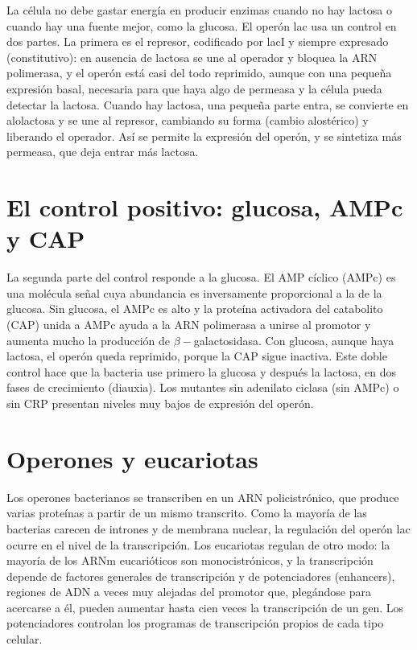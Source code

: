 \documentclass{book}
\begin{document}
La célula no debe gastar energía en producir enzimas cuando no hay lactosa o cuando hay una fuente mejor, como la glucosa. El operón lac usa un control en dos partes. La primera es el represor, codificado por lacI y siempre expresado (constitutivo): en ausencia de lactosa se une al operador y bloquea la ARN polimerasa, y el operón está casi del todo reprimido, aunque con una pequeña expresión basal, necesaria para que haya algo de permeasa y la célula pueda detectar la lactosa. Cuando hay lactosa, una pequeña parte entra, se convierte en alolactosa y se une al represor, cambiando su forma (cambio alostérico) y liberando el operador. Así se permite la expresión del operón, y se sintetiza más permeasa, que deja entrar más lactosa.


\section{El control positivo: glucosa, AMPc y CAP}

La segunda parte del control responde a la glucosa. El AMP cíclico (AMPc) es una molécula señal cuya abundancia es inversamente proporcional a la de la glucosa. Sin glucosa, el AMPc es alto y la proteína activadora del catabolito (CAP) unida a AMPc ayuda a la ARN polimerasa a unirse al promotor y aumenta mucho la producción de \(\beta-\)galactosidasa. Con glucosa, aunque haya lactosa, el operón queda reprimido, porque la CAP sigue inactiva. Este doble control hace que la bacteria use primero la glucosa y después la lactosa, en dos fases de crecimiento (diauxia). Los mutantes sin adenilato ciclasa (sin AMPc) o sin CRP presentan niveles muy bajos de expresión del operón.


\section{Operones y eucariotas}

Los operones bacterianos se transcriben en un ARN policistrónico, que produce varias proteínas a partir de un mismo transcrito. Como la mayoría de las bacterias carecen de intrones y de membrana nuclear, la regulación del operón lac ocurre en el nivel de la transcripción. Los eucariotas regulan de otro modo: la mayoría de los ARNm eucarióticos son monocistrónicos, y la transcripción depende de factores generales de transcripción y de potenciadores (enhancers), regiones de ADN a veces muy alejadas del promotor que, plegándose para acercarse a él, pueden aumentar hasta cien veces la transcripción de un gen. Los potenciadores controlan los programas de transcripción propios de cada tipo celular.
\end{document}
